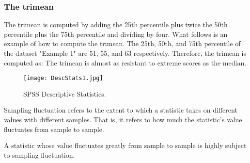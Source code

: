 \documentclass[12pt, a4paper]{report}
\begin{document}
\subsubsection{The trimean}
The trimean is computed by adding the 25th percentile plus twice the 50th percentile plus the 75th percentile and dividing by four. What follows is an example of how to compute the trimean. The 25th, 50th, and 75th percentile of the dataset "Example 1" are 51, 55, and 63 respectively. Therefore, the trimean is computed as:
The trimean is almost as resistant to extreme scores as the median.




\begin{figure}[h!]
\begin{center}
  \texttt{[image: DescStats1.jpg]}
  \caption{SPSS Descriptive Statistics.}\label{DescStats}
\end{center}
\end{figure}
Sampling fluctuation refers to the extent to which a statistic takes on different values with different samples. That is, it refers to how much the statistic's value fluctuates from sample to sample.

A statistic whose value fluctuates greatly from sample to sample is highly subject to sampling fluctuation.
\end{document}
